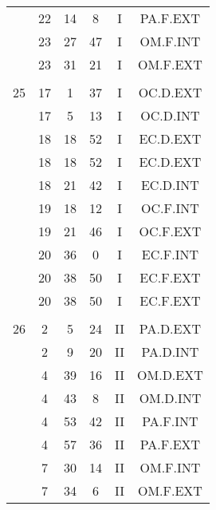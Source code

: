 \documentclass[12pt, a4paper]{article}
\begin{document}
\begin{multicols}{3}
{\begin{tabular}{c c c c c c}
	 	 	 	 & 22 & 14 & 8 & I & PA.F.EXT\\%
	 	 	 	 & 23 & 27 & 47 & I & OM.F.INT\\%
	 	 	 	 & 23 & 31 & 21 & I & OM.F.EXT\\%
	 	 	 	 & & & & & \\%
	 	 	 	25 & 17 & 1 & 37 & I & OC.D.EXT\\%
	 	 	 	 & 17 & 5 & 13 & I & OC.D.INT\\%
	 	 	 	 & 18 & 18 & 52 & I & EC.D.EXT\\%
	 	 	 	 & 18 & 18 & 52 & I & EC.D.EXT\\%
	 	 	 	 & 18 & 21 & 42 & I & EC.D.INT\\%
	 	 	 	 & 19 & 18 & 12 & I & OC.F.INT\\%
	 	 	 	 & 19 & 21 & 46 & I & OC.F.EXT\\%
	 	 	 	 & 20 & 36 & 0 & I & EC.F.INT\\%
	 	 	 	 & 20 & 38 & 50 & I & EC.F.EXT\\%
	 	 	 	 & 20 & 38 & 50 & I & EC.F.EXT\\%
	 	 	 	 & & & & & \\%
	 	 	 	26 & 2 & 5 & 24 & II & PA.D.EXT\\%
	 	 	 	 & 2 & 9 & 20 & II & PA.D.INT\\%
	 	 	 	 & 4 & 39 & 16 & II & OM.D.EXT\\%
	 	 	 	 & 4 & 43 & 8 & II & OM.D.INT\\%
	 	 	 	 & 4 & 53 & 42 & II & PA.F.INT\\%
	 	 	 	 & 4 & 57 & 36 & II & PA.F.EXT\\%
	 	 	 	 & 7 & 30 & 14 & II & OM.F.INT\\%
	 	 	 	 & 7 & 34 & 6 & II & OM.F.EXT\\%

\end{tabular}}
\end{multicols}
\end{document}
